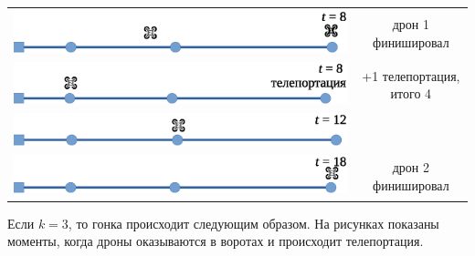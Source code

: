 \begin{center}
\begin{tabular}{cc}
\includegraphics[scale=0.7]{sample-2-08.eps}&дрон 1 финишировал\\[0.3cm]
\includegraphics[scale=0.7]{sample-2-09.eps}&{+1 телепортация, итого 4}\\[0.8cm]
\includegraphics[scale=0.7]{sample-2-10.eps}\\[0.8cm]
\includegraphics[scale=0.7]{sample-2-11.eps}&дрон 2 финишировал\\
\end{tabular}
\end{center}

Если $k=3$, то гонка происходит следующим образом. На рисунках показаны моменты, когда дроны оказываются в воротах и происходит телепортация.


